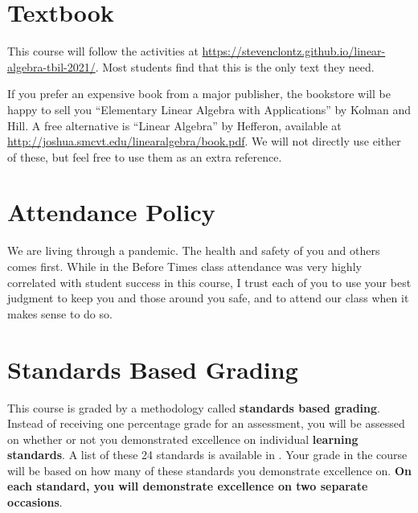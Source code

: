 \documentclass{article}
\begin{document}
\section*{\fontsize{12}{15}\selectfont Textbook}
This course will follow the activities at \url{https://stevenclontz.github.io/linear-algebra-tbil-2021/}. Most students find that this is the only text they need.

If you prefer an expensive book from a major publisher, the bookstore will be happy to sell you ``Elementary Linear Algebra with Applications'' by Kolman and Hill.  A free alternative is ``Linear Algebra'' by Hefferon, available at \url{http://joshua.smcvt.edu/linearalgebra/book.pdf}. We will not directly use either of these, but feel free to use them as an extra reference.


\section*{\fontsize{12}{15}\selectfont Attendance Policy}
We are living through a pandemic. The health and safety of you and others comes first. While in the Before Times class attendance was very highly correlated with student success in this course, I trust each of you to use your best judgment to keep you and those around you safe, and to attend our class when it makes sense to do so.

\section*{\fontsize{12}{15}\selectfont Standards Based Grading}
This course is graded by a methodology called {\bf standards based grading}.  Instead of receiving one percentage grade for an assessment, you will be assessed on whether or not you demonstrated excellence on individual {\bf learning standards}.  A list of these 24 standards is available in \LMS.  Your grade in the course will be based on how many of these standards you demonstrate excellence on.  {\bf On each standard, you will demonstrate excellence on two separate occasions}.
\end{document}
